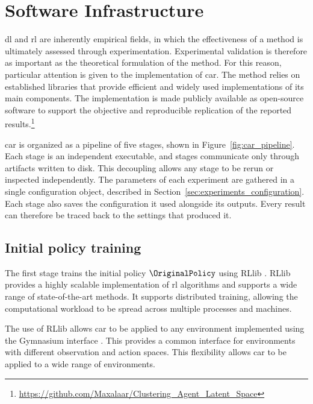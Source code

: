 \section{Software Infrastructure}
\label{sec:experiments_software_infrastructure}

\gls{dl} and \gls{rl} are inherently empirical fields, in which the effectiveness of a method is ultimately assessed through experimentation.
Experimental validation is therefore as important as the theoretical formulation of the method.
For this reason, particular attention is given to the implementation of \gls{car}.
The method relies on established libraries that provide efficient and widely used implementations of its main components.
The implementation is made publicly available as open-source software to support the objective and reproducible replication of the reported results.\footnote{\url{https://github.com/Maxalaar/Clustering_Agent_Latent_Space}}

\gls{car} is organized as a pipeline of five stages, shown in Figure~\ref{fig:car_pipeline}.
Each stage is an independent executable, and stages communicate only through artifacts written to disk.
This decoupling allows any stage to be rerun or inspected independently.
The parameters of each experiment are gathered in a single configuration object, described in Section~\ref{sec:experiments_configuration}.
Each stage also saves the configuration it used alongside its outputs.
Every result can therefore be traced back to the settings that produced it.



\subsection{Initial policy training}

The first stage trains the initial policy $\OriginalPolicy$ using RLlib \cite{moritz2018ray, liang2018rllib}.
RLlib provides a highly scalable implementation of \gls{rl} algorithms and supports a wide range of state-of-the-art methods.
It supports distributed training, allowing the computational workload to be spread across multiple processes and machines.

The use of RLlib allows \gls{car} to be applied to any environment implemented using the Gymnasium interface \cite{towers2024gymnasium}.
This provides a common interface for environments with different observation and action spaces.
This flexibility allows \gls{car} to be applied to a wide range of environments.

